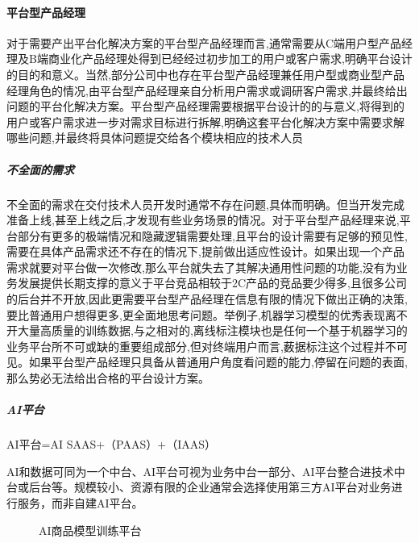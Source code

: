 \documentclass[letterpaper,10pt,english]{sphinxmanual}
\begin{document}
\paragraph{平台型产品经理}
\label{\detokenize{chapter_introduction/platform:id4}}
对于需要产出平台化解决方案的平台型产品经理而言,通常需要从C端用户型产品经理及B端商业化产品经理处得到已经经过初步加工的用户或客户需求,明确平台设计的目的和意义。当然,部分公司中也存在平台型产品经理兼任用户型或商业型产品经理角色的情况,由平台型产品经理亲自分析用户需求或调研客户需求,并最终给出问题的平台化解决方案。平台型产品经理需要根据平台设计的的与意义,将得到的用户或客户需求进一步对需求目标进行拆解,明确这套平台化解决方案中需要求解哪些问题,并最终将具体问题提交给各个模块相应的技术人员


\subparagraph{不全面的需求}
\label{\detokenize{chapter_introduction/platform:id5}}
不全面的需求在交付技术人员开发时通常不存在问题,具体而明确。但当开发完成准备上线,甚至上线之后,才发现有些业务场景的情况。对于平台型产品经理来说,平台部分有更多的极端情况和隐藏逻辑需要处理,且平台的设计需要有足够的预见性,需要在具体产品需求还不存在的情况下,提前做出适应性设计。如果出现一个产品需求就要对平台做一次修改,那么平台就失去了其解决通用性问题的功能,没有为业务发展提供长期支撑的意义于平台竞品相较于2C产品的竞品要少得多,且很多公司的后台并不开放,因此更需要平台型产品经理在信息有限的情况下做出正确的决策,要比普通用户想得更多,更全面地思考问题。举例子,机器学习模型的优秀表现离不开大量高质量的训练数据,与之相对的,离线标注模块也是任何一个基于机器学习的业务平台所不可或缺的重要组成部分,但对终端用户而言,薮据标注这个过程并不可见。如果平台型产品经理只具备从普通用户角度看问题的能力,停留在问题的表面,那么势必无法给出合格的平台设计方案。
%
\begin{footnote}[129]\sphinxAtStartFootnote
{}
%
\end{footnote}


\subparagraph{AI平台}
\label{\detokenize{chapter_introduction/platform:ai}}
AI平台=AI SAAS+（PAAS）+（IAAS）

AI和数据可同为一个中台、AI平台可视为业务中台一部分、AI平台整合进技术中台或后台等。规模较小、资源有限的企业通常会选择使用第三方AI平台对业务进行服务，而非自建AI平台。

\begin{figure}[H]
\centering
\capstart

\noindent{}
\caption{AI商品模型训练平台}\label{\detokenize{chapter_introduction/platform:id13}}\end{figure}
\end{document}
